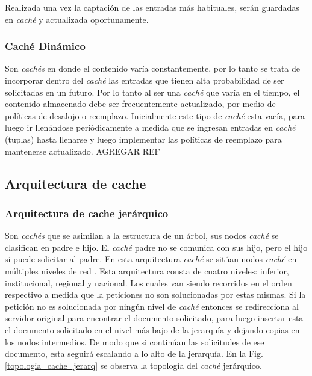\documentclass[12pt]{ociamthesis}  %
\begin{document}
Realizada una vez la captación de las entradas más habituales, serán guardadas en \textit{caché} y actualizada oportunamente.\\

\subsubsection{Caché Dinámico}
Son \textit{cachés} en donde el contenido varía constantemente, por lo tanto se trata de incorporar dentro del \textit{caché} las entradas que tienen alta probabilidad de ser solicitadas en un futuro. Por lo tanto al ser una \textit{caché} que varía en el tiempo, el contenido almacenado debe ser frecuentemente actualizado, por medio de políticas de desalojo o reemplazo. Inicialmente este tipo de \textit{caché} esta vacía, para luego ir llenándose periódicamente a medida que se ingresan entradas en \textit{caché} (tuplas) hasta llenarse y luego implementar las políticas de reemplazo para mantenerse actualizado. AGREGAR REF\\

\subsection{Arquitectura de cache}

\subsubsection{Arquitectura de cache jerárquico}
Son \textit{cachés} que se asimilan a la estructura de un árbol, sus nodos \textit{caché} se clasifican en padre e hijo. El \textit{caché} padre no se comunica con sus hijo, pero el hijo si puede solicitar al padre. En esta arquitectura \textit{caché} se sitúan nodos \textit{caché} en múltiples niveles de red \cite{rodriguez2001analysis}. Esta arquitectura consta de cuatro niveles: inferior, institucional, regional y nacional. Los cuales van siendo recorridos en el orden respectivo a medida que la peticiones no son solucionadas por estas mismas. Si la petición no es solucionada por ningún nivel de \textit{caché} entonces se redirecciona al servidor original para encontrar el documento solicitado, para luego insertar esta el documento solicitado en el nivel más bajo de la jerarquía y dejando copias en los nodos intermedios. De modo que si continúan las solicitudes de ese documento, esta seguirá escalando a lo alto de la jerarquía. En la Fig. \ref{topologia_cache_jerarq} se observa la topología del \textit{caché} jerárquico.
\end{document}
